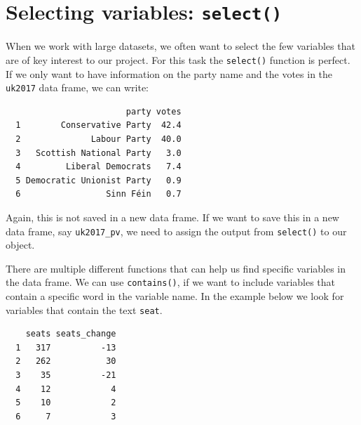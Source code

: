 \documentclass[12pt,oneside]{reedthesis}
\theoremstyle{definition}
\theoremstyle{definition}
\theoremstyle{definition}
\theoremstyle{remark}
\begin{document}
  \section{\texorpdfstring{Selecting variables:
  \texttt{select()}}{Selecting variables: select()}}\label{selecting-variables-select}
  
  When we work with large datasets, we often want to select the few
  variables that are of key interest to our project. For this task the
  \texttt{select()} function is perfect. If we only want to have
  information on the party name and the votes in the \texttt{uk2017} data
  frame, we can write:
  \begin{Shaded}
  \begin{Highlighting}[]
  \end{Highlighting}
  \end{Shaded}
  \begin{verbatim}
                        party votes
  1        Conservative Party  42.4
  2              Labour Party  40.0
  3   Scottish National Party   3.0
  4         Liberal Democrats   7.4
  5 Democratic Unionist Party   0.9
  6                 Sinn Féin   0.7
  \end{verbatim}
  Again, this is not saved in a new data frame. If we want to save this in
  a new data frame, say \texttt{uk2017\_pv}, we need to assign the output
  from \texttt{select()} to our object.
  \begin{Shaded}
  \begin{Highlighting}[]
  \StringTok{ }
  \end{Highlighting}
  \end{Shaded}
  There are multiple different functions that can help us find specific
  variables in the data frame. We can use \texttt{contains()}, if we want
  to include variables that contain a specific word in the variable name.
  In the example below we look for variables that contain the text
  \texttt{seat}.
  \begin{Shaded}
  \begin{Highlighting}[]
  \NormalTok{(}\NormalTok{))}
  \end{Highlighting}
  \end{Shaded}
  \begin{verbatim}
    seats seats_change
  1   317          -13
  2   262           30
  3    35          -21
  4    12            4
  5    10            2
  6     7            3
  \end{verbatim}
\end{document}
